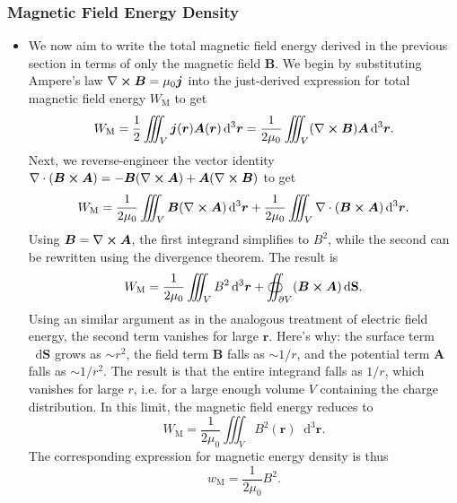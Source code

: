 \documentclass[11pt, a4paper]{article}
\newcommand{\diff}{\mathop{}\!\mathrm{d}} %
\newcommand{\dr}{\diff^{3} \r}  %
\renewcommand{\vec}[1]{\bm{#1}} %
\renewcommand{\r}{\vec{r}}
\newcommand{\B}{\vec{B}} %
\newcommand{\A}{\vec{A}} %
\renewcommand{\S}{\mathbf{S}}  %
\newcommand{\mm}{\mu_{0}}  %
\renewcommand{\j}{\vec{j}}  %
\renewcommand{\div}{\nabla \cdot}
\renewcommand{\curl}{\nabla \cross}
\begin{document}
\subsubsection{Magnetic Field Energy Density}
\begin{itemize}
    \item We now aim to write the total magnetic field energy derived in the previous section in terms of only the magnetic field $ \B $. We begin by substituting Ampere's law $ \curl \B = \mm \j $ into the just-derived expression for total magnetic field energy $ W_{\text{M}} $ to get
    \begin{equation*}
        W_{\text{M}} = \frac{1}{2} \iiint_{V} \j(\r) \A(\r) \dr = \frac{1}{2\mm}\iiint_{V}(\curl \B) \A \dr.
    \end{equation*}
    Next, we reverse-engineer the vector identity $ \div (\B \cross \A) = - \B (\curl \A) + \A (\curl \B) $ to get
    \begin{equation*}
        W_{\text{M}} = \frac{1}{2\mm} \iiint_{V} \B(\curl \A)\dr + \frac{1}{2\mm} \iiint_{V} \div (\B \cross \A) \dr.
    \end{equation*}
    Using $ \B = \curl \A $, the first integrand simplifies to $ B^{2} $, while the second can be rewritten using the divergence theorem. The result is
    \begin{equation*}
        W_{\text{M}} = \frac{1}{2\mm} \iiint_{V} B^{2} \dr + \oiint_{\partial V} (\B \cross \A) \diff \S.
    \end{equation*}
    Using an similar argument as in the analogous treatment of electric field energy, the second term vanishes for large $ \r $. Here's why: the surface term $ \diff \S $ grows as $ \sim r^{2} $, the field term $ \B $ falls as $ \sim 1/r $, and the potential term $ \A $ falls as $ \sim 1/r^{2} $. The result is that the entire integrand falls as $ 1/r $, which vanishes for large $ r $, i.e. for a large enough volume $ V $ containing the charge distribution. In this limit, the magnetic field energy reduces to
    \begin{equation*}
        W_{\text{M}} = \frac{1}{2\mm} \iiint_{V}B^{2}(\r)\dr.
    \end{equation*}
    The corresponding expression for magnetic energy density is thus
    \begin{equation*}
        w_{\text{M}} = \frac{1}{2\mm} B^{2}.
    \end{equation*}
    
    
\end{itemize}
\end{document}
